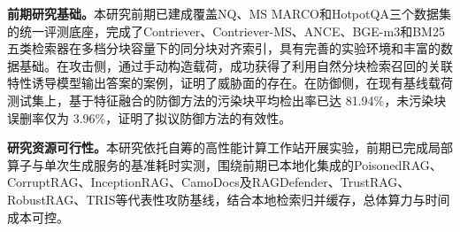 \textbf{前期研究基础。}本研究前期已建成覆盖NQ、MS MARCO和HotpotQA三个数据集的统一评测底座，完成了Contriever、Contriever-MS、ANCE、BGE-m3和BM25五类检索器在多档分块容量下的同分块对齐索引，具有完善的实验环境和丰富的数据基础。在攻击侧，通过手动构造载荷，成功获得了利用自然分块检索召回的关联特性诱导模型输出答案的案例，证明了威胁面的存在。在防御侧，在现有基线载荷测试集上，基于特征融合的防御方法的污染块平均检出率已达 81.94\%，未污染块误删率仅为 3.96\%，证明了拟议防御方法的有效性。

\textbf{研究资源可行性。}本研究依托自筹的高性能计算工作站开展实验，前期已完成局部算子与单次生成服务的基准耗时实测，围绕前期已本地化集成的PoisonedRAG、CorruptRAG、InceptionRAG、CamoDocs及RAGDefender、TrustRAG、RobustRAG、TRIS等代表性攻防基线，结合本地检索归并缓存，总体算力与时间成本可控。